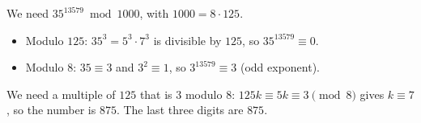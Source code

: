 We need $35^{13579}\bmod1000$, with $1000=8\cdot125$.
\begin{itemize}
\item Modulo $125$: $35^3=5^3\cdot7^3$ is divisible by $125$, so $35^{13579}\equiv0$.
\item Modulo $8$: $35\equiv3$ and $3^2\equiv1$, so $3^{13579}\equiv3$ (odd exponent).
\end{itemize}
We need a multiple of $125$ that is $3$ modulo $8$: $125k\equiv5k\equiv3\pmod8$ gives $k\equiv7$, so the number is $875$. The last three digits are $\boxed{875}$.

